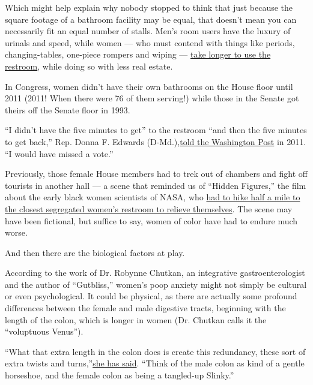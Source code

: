 Which might help explain why nobody stopped to think that just because
the square footage of a bathroom facility may be equal, that doesn't
mean you can necessarily fit an equal number of stalls. Men's room users
have the luxury of urinals and speed, while women --- who must contend
with things like periods, changing-tables, one-piece rompers and wiping
---
\href{https://journals.sagepub.com/doi/abs/10.1177/0885412206295846}{take
longer to use the restroom}, while doing so with less real estate.

In Congress, women didn't have their own bathrooms on the House floor
until 2011 (2011! When there were 76 of them serving!) while those in
the Senate got theirs off the Senate floor in 1993.

``I didn't have the five minutes to get'' to the restroom ``and then the
five minutes to get back,'' Rep. Donna F. Edwards
(D-Md.),\href{https://www.washingtonpost.com/lifestyle/style/women-in-the-house-get-a-restroom/2011/07/28/gIQAFgdwfI_story.html}{told
the Washington Post} in 2011. ``I would have missed a vote.''

Previously, those female House members had to trek out of chambers and
fight off tourists in another hall --- a scene that reminded us of
``Hidden Figures,'' the film about the early black women scientists of
NASA, who
\href{https://www.thecut.com/2017/01/hidden-figures-shows-how-a-bathroom-break-can-change-history.html}{had
to hike half a mile to the closest segregated women's restroom to
relieve themselves}. The scene may have been fictional, but suffice to
say, women of color have had to endure much worse.

And then there are the biological factors at play.

According to the work of Dr. Robynne Chutkan, an integrative
gastroenterologist and the author of ``Gutbliss,'' women's poop anxiety
might not simply be cultural or even psychological. It could be
physical, as there are actually some profound differences between the
female and male digestive tracts, beginning with the length of the
colon, which is longer in women (Dr. Chutkan calls it the ``voluptuous
Venus'').

``What that extra length in the colon does is create this redundancy,
these sort of extra twists and
turns,''\href{https://www.theatlantic.com/health/archive/2013/10/what-we-eat-affects-everything/279922/}{she
has said}. ``Think of the male colon as kind of a gentle horseshoe, and
the female colon as being a tangled-up Slinky.''

